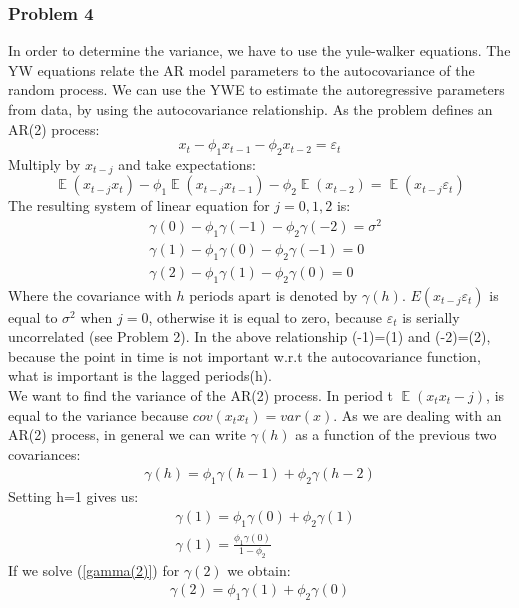 \documentclass{article}
\DeclareMathOperator{\E}{\mathbb{E}}
\begin{document}
\subsubsection*{Problem 4}
In order to determine the variance, we have to use the yule-walker equations.  The YW equations relate the AR model parameters to the autocovariance of the random process. We can use the YWE to estimate the autoregressive parameters from data, by using the autocovariance relationship. 
As the problem defines an AR(2) process:
\begin{equation*}
x_t-\phi_1x_{t-1}-\phi_2x_{t-2}=\varepsilon_t
\end{equation*}
Multiply by $x_{t-j}$ and take expectations:
\begin{equation*}
\E(x_{t-j}x_t)-\phi_1\E(x_{t-j}x_{t-1})-\phi_2\E(x_{t-2})=\E(x_{t-j}\varepsilon_t)
\end{equation*}
The resulting system of linear equation for $j=0, 1, 2$ is:
\begin{align}\label{yw1}
& \gamma(0)-\phi_1\gamma(-1)-\phi_2\gamma(-2)=\sigma^2\\
& \gamma(1)-\phi_1\gamma(0)-\phi_2\gamma(-1)=0\\
& \gamma(2)-\phi_1\gamma(1)-\phi_2\gamma(0)=0\label{gamma(2)}
\end{align}
Where the covariance with $h$ periods apart is denoted by $\gamma(h)$. $E(x_{t-j} \varepsilon_t)$ is equal to $\sigma^2$ when $j=0$, otherwise it is equal to zero, because $\varepsilon_t$ is serially uncorrelated (see Problem 2). In the above relationship (-1)=(1) and (-2)=(2), because the point in time is not important w.r.t the autocovariance function, what is important is the lagged periods(h).\\[0.1in]
We want to find the variance of the AR(2) process. In period t $\E (x_t x_t-j)$, is equal to the variance because $cov(x_t x_t)=var(x)$.
As we are dealing with an AR(2) process, in general we can write $\gamma(h)$ as a function of the previous two covariances:
\begin{align*}
\gamma(h)=\phi_1\gamma(h-1)+\phi_2\gamma(h-2)
\end{align*}
Setting h=1 gives us: 
\begin{align}
& \gamma(1)=\phi_1\gamma(0)+\phi_2\gamma(1)\\
& \gamma(1)=\frac{\phi_1\gamma(0)}{1-\phi_2} \label{gamma(1)}
\end{align}
If we solve (\ref{gamma(2)}) for $\gamma(2)$ we obtain: 
\begin{align*}
\gamma(2)=\phi_1\gamma(1)+\phi_2\gamma(0)
\end{align*}
\end{document}

